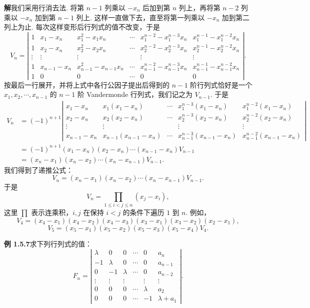 \documentclass[UTF8, 12pt, fontset=fandol, oneside]{ctexart}
\begin{document}
\noindent\textbf{解}\quad 我们采用行消去法. 将第 $n-1$ 列乘以 $-x_n$ 后加到第 $n$ 列上，再将第 $n-2$ 列乘以 $-x_n$ 加到第 $n-1$ 列上. 这样一直做下去，直至将第一列乘以 $-x_n$ 加到第二列上为止. 每次这样变形后行列式的值不改变，于是
\[
V_n=
\left|\begin{array}{cccccc}
1 & x_1-x_n & x_1^2-x_1x_n & \cdots & x_1^{n-2}-x_1^{n-3}x_n & x_1^{n-1}-x_1^{n-2}x_n\\
1 & x_2-x_n & x_2^2-x_2x_n & \cdots & x_2^{n-2}-x_2^{n-3}x_n & x_2^{n-1}-x_2^{n-2}x_n\\
\vdots & \vdots & \vdots & & \vdots & \vdots\\
1 & x_{n-1}-x_n & x_{n-1}^2-x_{n-1}x_n & \cdots & x_{n-1}^{n-2}-x_{n-1}^{n-3}x_n & x_{n-1}^{n-1}-x_{n-1}^{n-2}x_n\\
1 & 0 & 0 & \cdots & 0 & 0
\end{array}\right|.
\]
按最后一行展开，并将上式中各行公因子提出后得到的 $n-1$ 阶行列式恰好是一个 $x_1,x_2,\cdots,x_{n-1}$ 的 $n-1$ 阶 Vandermonde 行列式，我们记之为 $V_{n-1}$. 于是
\[
\begin{aligned}
V_n
&=(-1)^{n+1}
\left|\begin{array}{ccccc}
x_1-x_n & x_1(x_1-x_n) & \cdots & x_1^{n-3}(x_1-x_n) & x_1^{n-2}(x_1-x_n)\\
x_2-x_n & x_2(x_2-x_n) & \cdots & x_2^{n-3}(x_2-x_n) & x_2^{n-2}(x_2-x_n)\\
\vdots & \vdots & & \vdots & \vdots\\
x_{n-1}-x_n & x_{n-1}(x_{n-1}-x_n) & \cdots & x_{n-1}^{n-3}(x_{n-1}-x_n) & x_{n-1}^{n-2}(x_{n-1}-x_n)
\end{array}\right|\\
&=(-1)^{n+1}(x_1-x_n)(x_2-x_n)\cdots(x_{n-1}-x_n)V_{n-1}\\
&=(x_n-x_1)(x_n-x_2)\cdots(x_n-x_{n-1})V_{n-1}.
\end{aligned}
\]
我们得到了递推公式：
\[
V_n=(x_n-x_1)(x_n-x_2)\cdots(x_n-x_{n-1})V_{n-1}.
\]
于是
\[
V_n=\prod_{1\le i<j\le n}(x_j-x_i),
\]
这里 $\prod$ 表示连乘积，$i,j$ 在保持 $i<j$ 的条件下遍历 $1$ 到 $n$. 例如，
\[
V_4=(x_4-x_1)(x_4-x_2)(x_4-x_3)(x_3-x_1)(x_3-x_2)(x_2-x_1),
\]
\[
V_5=(x_5-x_1)(x_5-x_2)(x_5-x_3)(x_5-x_4)V_4.
\]

\noindent\textbf{例 1.5.7}\quad 求下列行列式的值：
\[
F_n=
\left|\begin{array}{cccccc}
\lambda & 0 & 0 & \cdots & 0 & a_n\\
-1 & \lambda & 0 & \cdots & 0 & a_{n-1}\\
0 & -1 & \lambda & \cdots & 0 & a_{n-2}\\
\vdots & \vdots & \vdots & & \vdots & \vdots\\
0 & 0 & 0 & \cdots & \lambda & a_2\\
0 & 0 & 0 & \cdots & -1 & \lambda+a_1
\end{array}\right|.
\]
\end{document}
